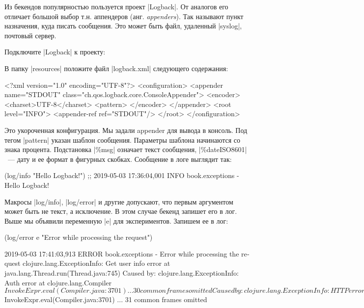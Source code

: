 Из бекендов популярностью пользуется проект \spverb|Logback|. От аналогов его
отличает большой выбор т.н. аппендеров (анг. \emph{appenders}). Так называют
пункт назначения, куда писать сообщения. Это может быть файл, удаленный
\spverb|syslog|, почтовый сервер.

Подключите \spverb|Logback| к проекту:

\begin{english}
  \begin{clojure}
  \end{clojure}
\end{english}

\noindent
В папку \spverb|resources| положите файл \spverb|logback.xml| следующего содержания:

\begin{english}
  \begin{xml}
<?xml version="1.0" encoding="UTF-8"?>
<configuration>
  <appender name="STDOUT" class="ch.qos.logback.core.ConsoleAppender">
    <encoder>
      <charset>UTF-8</charset>
      <pattern>%
    </encoder>
  </appender>
  <root level="INFO">
    <appender-ref ref="STDOUT"/>
  </root>
</configuration>
  \end{xml}
\end{english}

Это укороченная конфигурация. Мы задали appender для вывода в консоль. Под тегом
\spverb|pattern| указан шаблон сообщения. Параметры шаблона начинаются со знака
процента. Подстановка \spverb|\%msg| означает текст сообщения,
\spverb|\%date{ISO8601}|~--- дату и ее формат в фигурных скобках. Сообщение в
логе выглядит так:

\begin{english}
  \begin{clojure}
(log/info "Hello Logback!")
;; 2019-05-03 17:36:04,001 INFO  book.exceptions - Hello Logback!
  \end{clojure}
\end{english}

\label{log-ex-param}

Макросы \spverb|log/info|, \spverb|log/error| и другие допускают, что первым
аргументом может быть не текст, а исключение. В этом случае бекенд запишет его в
лог. Выше мы объявили переменную \spverb|e| для экспериментов. Запишем ее в лог:

\begin{english}
  \begin{clojure}
(log/error e "Error while processing the request")

2019-05-03 17:41:03,913 ERROR book.exceptions - Error while processing the request
clojure.lang.ExceptionInfo: Get user info error
    at java.lang.Thread.run(Thread.java:745)
Caused by: clojure.lang.ExceptionInfo: Auth error
    at clojure.lang.Compiler$InvokeExpr.eval(Compiler.java:3701)
    ... 30 common frames omitted
Caused by: clojure.lang.ExceptionInfo: HTTP error
    at clojure.lang.Compiler$InvokeExpr.eval(Compiler.java:3701)
    ... 31 common frames omitted
  \end{clojure}
\end{english}

